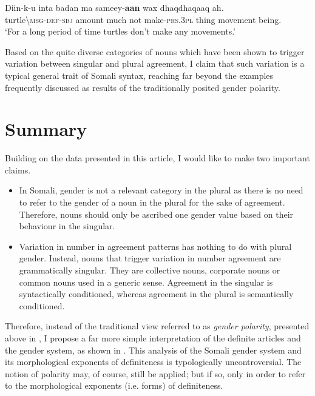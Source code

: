 \documentclass[output=paper]{langsci/langscibook}
\begin{document}
\ea
\gll Diin-k-u    inta  badan  ma  sameey-\textbf{aan}  wax  dhaqdhaqaaq  ah.\\
     turtle{\textbackslash}\textsc{msg-def-sbj  }amount  much  not  make-\textsc{prs.3pl  }thing  movement  being.\\
\glt ‘For a long period of time turtles don’t make any movements.’
\z

Based on the quite diverse categories of nouns which have been shown to trigger variation between singular and plural agreement, I claim that such variation is a typical general trait of Somali syntax, reaching far beyond the examples frequently discussed as results of the traditionally posited gender polarity.  

\section{Summary}

Building on the data presented in this article, I would like to make two important claims. 


\begin{itemize}
\item In Somali, gender is not a relevant category in the plural as there is no need to refer to the gender of a noun in the plural for the sake of agreement. Therefore, nouns should only be ascribed one gender value based on their behaviour in the singular. 

\item Variation in number in agreement patterns has nothing to do with plural gender. Instead, nouns that trigger variation in number agreement are grammatically singular. They are collective nouns, corporate nouns or common nouns used in a generic sense. Agreement in the singular is syntactically conditioned, whereas agreement in the plural is semantically conditioned.

\end{itemize}

Therefore, instead of the traditional view referred to as \textit{gender polarity}, presented above in , I propose a far more simple interpretation of the definite articles and the gender system, as shown in . This analysis of the Somali gender system and its morphological exponents of definiteness is typologically uncontroversial. The notion of polarity may, of course, still be applied; but if so, only in order to refer to the morphological exponents (i.e. forms) of definiteness.
\end{document}
